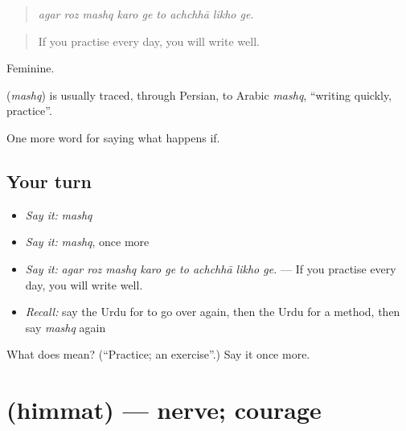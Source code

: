 \begin{quote}
        
\end{quote}

\begin{quote}
\emph{agar roz mashq karo ge to achchhā likho ge.}
\end{quote}

\begin{quote}
If you practise every day, you will write well.
\end{quote}

Feminine.

\begin{cousinweb}
\textbf{} (\emph{mashq}) is usually traced, through Persian, to Arabic \emph{mashq}, \textquotedblleft{}writing quickly, practice\textquotedblright{}.
\end{cousinweb}

\begin{grammarlens}[title={What you've built}]
One more word for saying what happens if.
\end{grammarlens}

\subsection*{Your turn}
\begin{itemize}
\raggedright
  \item \emph{Say it:} \emph{mashq}
  \item \emph{Say it:} \emph{mashq}, once more
  \item \emph{Say it:} \emph{agar roz mashq karo ge to achchhā likho ge.} — If you practise every day, you will write well.
  \item \emph{Recall:} say the Urdu for to go over again, then the Urdu for a method, then say \emph{mashq} again
\end{itemize}

\begin{tcolorbox}[breakable,colback=teal!4,colframe=teal!35!black,title={Before you move on}]
What does  mean? (\textquotedblleft{}Practice; an exercise\textquotedblright{}.) Say it once more.
\end{tcolorbox}
\section[\texorpdfstring{\ur{ہمت} (himmat)}{ہمت (himmat)}]{ (himmat) — nerve; courage}

